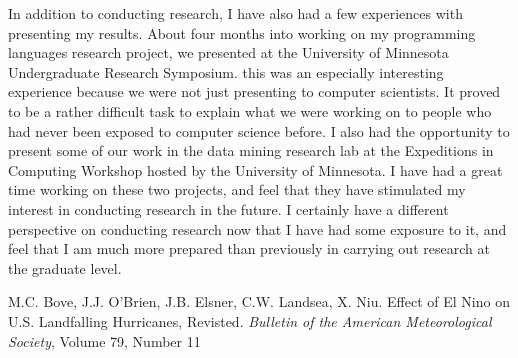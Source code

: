 \documentclass[a4paper,12pt]{article}
\newcommand{\tab}{\hspace*{2em}}
\begin{document}
\tab In addition to conducting research, I have also had a few experiences with presenting my results.  About four months into working on my programming languages research project, we presented at the University of Minnesota Undergraduate Research Symposium.  this was an especially interesting experience because we were not just presenting to computer scientists.  It proved to be a rather difficult task to explain what we were working on to people who had never been exposed to computer science before. I also had the opportunity to present some of our work in the data mining research lab at the Expeditions in Computing Workshop hosted by the University of Minnesota. \newline
\tab I have had a great time working on these two projects, and feel that they have stimulated my interest in conducting research in the future.  I certainly have a different perspective on conducting research now that I have had some exposure to it, and feel that I am much more prepared than previously in carrying out research at the graduate level.  
\begin{thebibliography}{9} \vspace{-1ex}
\footnotesize
M.C. Bove, J.J. O'Brien, J.B. Elsner, C.W. Landsea, X. Niu.  Effect of El Nino on U.S. Landfalling Hurricanes, Revisted.  \textit{Bulletin of the American Meteorological Society}, Volume 79, Number 11
\end{thebibliography}
\end{document}

